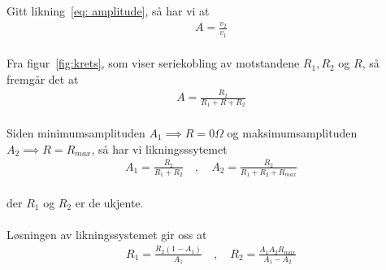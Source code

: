 \documentclass[a4paper,11pt,norsk]{article}
\newcommand{\comma}{\quad , \quad}
\def\spliteq#1{\begin{equation}\begin{split}{#1}\end{split}\end{equation}\\}
\begin{document}
Gitt likning~\ref{eq: amplitude}, så har vi at
\spliteq {
    A = \frac{v_2}{v_1}
}
Fra figur~\ref{fig:krets}, som viser seriekobling av motstandene $R_1, R_2$ og $R$, så fremgår det at
\spliteq {
    A = \frac{R_2}{R_1 + R  + R_2}
}

Siden minimumsamplituden $A_1 \implies R = 0\Omega$ og maksimumsamplituden $A_2 \implies R = R_{max}$, så har vi likningsssytemet
\spliteq {
    A_1 = \frac{R_2}{R_1+R_2}\comma
    A_2 = \frac{R_2}{R_1+R_2+R_{max}}
}
der $R_1$ og $R_2$ er de ukjente. \\\\
Løsningen av likningssystemet gir oss at
\spliteq {
    R_1 = \frac{R_2(1-A_1)}{A_1} \comma
    R_2 = \frac{A_1A_2R_{max}}{A_1-A_2}
}
\end{document}
